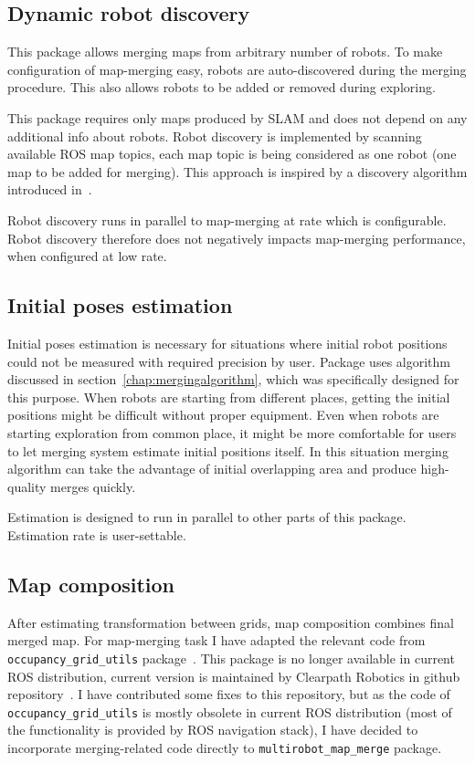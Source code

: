 \subsection{Dynamic robot discovery}

This package allows merging maps from arbitrary number of robots. To make configuration of map-merging easy, robots are auto-discovered during the merging procedure. This also allows robots to be added or removed during exploring.

This package requires only maps produced by \gls{SLAM} and does not depend on any additional info about robots. Robot discovery is implemented by scanning available \gls{ROS} map topics, each map topic is being considered as one robot (one map to be added for merging). This approach is inspired by a discovery algorithm introduced in~\cite{Yan2014}.

Robot discovery runs in parallel to map-merging at rate which is configurable. Robot discovery therefore does not negatively impacts map-merging performance, when configured at low rate.

\subsection{Initial poses estimation}

Initial poses estimation is necessary for situations where initial robot positions could not be measured with required precision by user. Package uses algorithm discussed in section~\ref{chap:mergingalgorithm}, which was specifically designed for this purpose. When robots are starting from different places, getting the initial positions might be difficult without proper equipment. Even when robots are starting exploration from common place, it might be more comfortable for users to let merging system estimate initial positions itself. In this situation merging algorithm can take the advantage of initial overlapping area and produce high-quality merges quickly.

Estimation is designed to run in parallel to other parts of this package. Estimation rate is user-settable.

\subsection{Map composition}

After estimating transformation between grids, map composition combines final merged map. For map-merging task I have adapted the relevant code from \texttt{occu\-pan\-cy\_grid\_uti\-ls} package~\cite{Marthi2014}. This package is no longer available in current \gls{ROS} distribution, current version is maintained by Clearpath Robotics in github repository~\cite{GitHubOccGridUtils}. I have contributed some fixes to this repository, but as the code of \texttt{occu\-pan\-cy\_grid\_uti\-ls} is mostly obsolete in current \gls{ROS} distribution (most of the functionality is provided by \gls{ROS} navigation stack), I have decided to incorporate merging-related code directly to \texttt{multi\-robot\_map\_merge} package.

